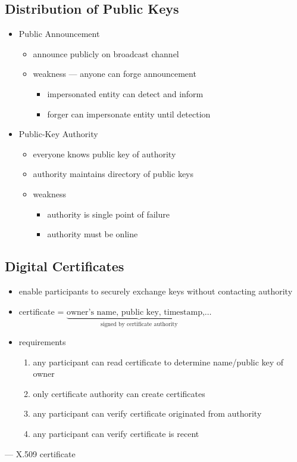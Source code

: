 \documentclass[draft]{article}
\begin{document}
\subsection{Distribution of Public Keys}
\begin{itemize}[nosep]
    \item Public Announcement
          \begin{itemize}[nosep]
              \item announce publicly on broadcast channel
              \item weakness --- anyone can forge announcement
                    \begin{itemize}[nosep]
                        \item impersonated entity can detect and inform
                        \item forger can impersonate entity until detection
                    \end{itemize}
          \end{itemize}
    \item Public-Key Authority
          \begin{itemize}[nosep]
              \item everyone knows public key of authority
              \item authority maintains directory of public keys
              \item weakness
                    \begin{itemize}[nosep]
                        \item authority is single point of failure
                        \item authority must be online
                    \end{itemize}
          \end{itemize}
\end{itemize}
\subsection{Digital Certificates}
\begin{itemize}[nosep]
    \item enable participants to securely exchange keys without contacting authority
    \item certificate = $\underbrace{\text{owner's name, public key, timestamp,}\dots}_{\text{signed by certificate authority}}$
    \item requirements
          \begin{enumerate}[nosep]
              \item any participant can read certificate to determine name/public key of owner
              \item only certificate authority can create certificates
              \item any participant can verify certificate originated from authority
              \item any participant can verify certificate is recent
          \end{enumerate}
\end{itemize}
 --- \glsdesc{X.509 certificate}
\end{document}

